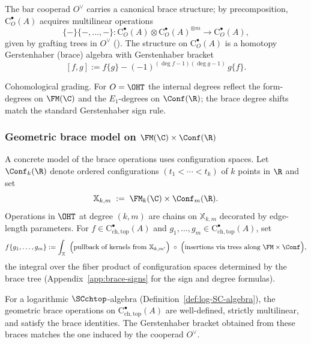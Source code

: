\begin{definition}
\label{def:brace-ops}
The bar cooperad $O^\vee$ carries a canonical brace structure; by precomposition,
$\mathrm{C}^\bullet_O(A)$ acquires multilinear operations
\[
\{-\}\{-,\ldots,-\}\colon \mathrm{C}^\bullet_O(A)\otimes \mathrm{C}^\bullet_O(A)^{\otimes m}\longrightarrow \mathrm{C}^\bullet_O(A),
\]
given by grafting trees in $O^\vee$ (\cite{GJ94,Vor99}).
The structure on $\mathrm{C}^\bullet_O(A)$ is a homotopy Gerstenhaber (brace) algebra with Gerstenhaber bracket
\[
[f,g] := f\{g\} - (-1)^{(\deg f-1)(\deg g-1)}\, g\{f\}.
\]
\end{definition}

\begin{remark}
Cohomological grading. For $O=\OHT$ the internal degrees reflect the form-degrees on $\FM(\C)$ and the $E_1$-degrees on $\Conf(\R)$; the brace degree shifts match the standard Gerstenhaber sign rule.
\end{remark}

\subsubsection{\texorpdfstring{Geometric brace model on $\FM(\C)\times\Conf(\R)$}{Geometric brace model on FM(C) x Conf(R)}}
\label{subsec:geometric-brace}
A concrete model of the brace operations uses configuration spaces.
Let $\Conf_k(\R)$ denote ordered configurations $(t_1<\cdots<t_k)$ of $k$ points in $\R$ and set
\[
\mathbb{X}_{k,m} \;:=\; \FM_k(\C)\times \Conf_m(\R).
\]
Operations in $\OHT$ at degree $(k,m)$ are chains on $\mathbb{X}_{k,m}$ decorated by edge-length parameters.
For $f\in \mathrm{C}^\bullet_{\mathrm{ch,top}}(A)$ and $g_1,\dots,g_m\in \mathrm{C}^\bullet_{\mathrm{ch,top}}(A)$, set
\[
f\{g_1,\dots,g_m\} := \int_{\mathbb{X}} \;\;\Bigl(\text{pullback of kernels from } \mathbb{X}_{k,m'} \Bigr)\;\circ\;\Bigl(\text{insertions via trees along } \FM\times \Conf\Bigr),
\]
the integral over the fiber product of configuration spaces determined by the brace tree (Appendix~\ref{app:brace-signs} for the sign and degree formulas).

\begin{proposition}
\label{prop:geometric-braces-well-defined}
For a logarithmic $\SCchtop$-algebra (Definition~\ref{def:log-SC-algebra}), the geometric brace operations on $\mathrm{C}^\bullet_{\mathrm{ch,top}}(A)$ are well-defined, strictly multilinear, and satisfy the brace identities. The Gerstenhaber bracket obtained from these braces matches the one induced by the cooperad $O^\vee$.
\end{proposition}

